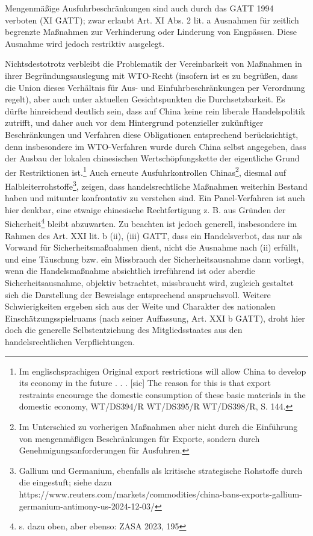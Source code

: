 \documentclass[12pt,a4paper,oneside]{book} %
\begin{document}
Mengenmäßige Ausfuhrbeschränkungen sind auch durch das GATT 1994 verboten (XI GATT); zwar erlaubt Art. XI Abs. 2 lit. a Ausnahmen für zeitlich begrenzte Maßnahmen zur Verhinderung oder Linderung von Engpässen. Diese Ausnahme wird jedoch restriktiv ausgelegt.

Nichtsdestotrotz verbleibt die Problematik der Vereinbarkeit von Maßnahmen in ihrer Begründungsauslegung mit WTO-Recht (insofern ist es zu begrüßen, dass die Union dieses Verhältnis für Aus- und Einfuhrbeschränkungen per Verordnung regelt), aber auch unter aktuellen Gesichtspunkten die Durchsetzbarkeit. Es dürfte hinreichend deutlich sein, dass auf China keine rein liberale Handelspolitik zutrifft, und daher auch vor dem Hintergrund potenzieller zukünftiger Beschränkungen und Verfahren diese Obligationen entsprechend berücksichtigt, denn insbesondere im WTO-Verfahren wurde durch China selbst angegeben, dass der Ausbau der lokalen chinesischen Wertschöpfungskette der eigentliche Grund der Restriktionen ist.\footnote{Im englischsprachigen Original \glqq [...]  export restrictions will allow China to develop its economy in the future . . . [sic] The reason for this is that export restraints encourage the domestic consumption of these basic materials in the domestic economy\grqq, WT/DS394/R WT/DS395/R WT/DS398/R, S. 144.} 
Auch erneute Ausfuhrkontrollen Chinas\footnote{Im Unterschied zu vorherigen Maßnahmen aber nicht durch die Einführung von mengenmäßigen Beschränkungen für Exporte, sondern durch Genehmigungsanforderungen für Ausfuhren.}, diesmal auf Halbleiterrohstoffe\footnote{Gallium und Germanium, ebenfalls als kritische strategische Rohstoffe durch die eingestuft; siehe dazu https://www.reuters.com/markets/commodities/china-bans-exports-gallium-germanium-antimony-us-2024-12-03/}, zeigen, dass handelsrechtliche Maßnahmen weiterhin Bestand haben und mitunter konfrontativ zu verstehen sind.\autocite{ZASA 2023, 195} Ein Panel-Verfahren ist auch hier denkbar, eine etwaige chinesische Rechtfertigung z. B. aus Gründen der Sicherheit\footnote{s. dazu oben, aber ebenso: ZASA 2023, 195} bleibt abzuwarten. Zu beachten ist jedoch generell, insbesondere im Rahmen des Art. XXI lit. b (ii), (iii) GATT, dass ein Handelsverbot, das nur als Vorwand für Sicherheitsmaßnahmen dient, nicht die Ausnahme nach (ii) erfüllt, und eine Täuschung bzw. ein Missbrauch der Sicherheitsausnahme dann vorliegt, wenn  die Handelsmaßnahme absichtlich irreführend ist oder aberdie Sicherheitsausnahme, objektiv betrachtet, missbraucht wird, zugleich gestaltet sich die Darstellung der Beweislage entsprechend anspruchsvoll.\autocites{ZASA 2023, 195, 197}{Ikeda, K.: A Proposed Interpretation of GATT Article XXI (b) (ii) in Light of its Implications for Export Control} Weitere Schwierigkeiten ergeben sich aus der Weite und Charakter des nationalen Einschätzungsspielruams (\glqq nach seiner Auffassung\grqq, Art. XXI b GATT), droht hier doch die generelle Selbstentziehung des Mitgliedsstaates aus den handelsrechtlichen Verpflichtungen.\autocite[Ausführlich]{Herdegen, Internationales Wirtschaftsrecht, Rn. 81ff.}
\end{document}
